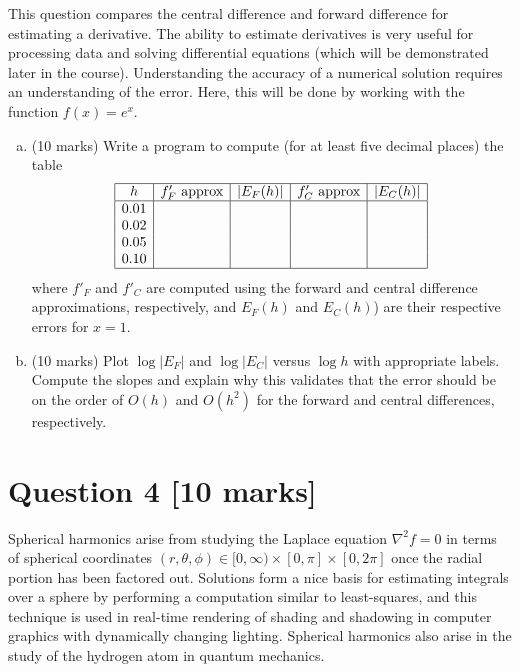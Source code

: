 \documentclass[12pt]{article}
\begin{document}
This question compares the central difference and forward difference for estimating a derivative. The ability to estimate derivatives is very useful for processing data and solving differential equations (which will be demonstrated later in the course). Understanding the accuracy of a numerical solution requires an understanding of the error. Here, this will be done by working with the function $f(x) = e^x$.

\begin{enumerate}[a.]
\item (10 marks) Write a program to compute (for at least five decimal places) the table
\[
\begin{array}{|c|c|c|c|c|}
\hline
h & f_F' \text{ approx} & |E_F(h)| & f'_C \text{ approx} & |E_C(h)| \\ \hline
0.01 &&&& \\
0.02 &&&& \\
0.05 &&&& \\
0.10 &&&& \\ \hline
\end{array}
\]
where $f'_F$ and $f'_C$ are computed using the forward and central difference approximations, respectively, and $E_F(h)$ and $E_C(h)$) are their respective errors for $x = 1$.

\item (10 marks) Plot $\log |E_F|$ and $\log |E_C|$ versus $\log h$ with appropriate labels. Compute the slopes and explain why this validates that the error should be on the order of $O(h)$ and $O(h^2)$ for the forward and central differences, respectively.
\end{enumerate}


\clearpage

\section{\fontsize{14}{14}\selectfont Question 4 [10 marks]}

Spherical harmonics arise from studying the Laplace equation $\nabla^2 f = 0$ in terms of spherical coordinates $(r, \theta, \phi) \in [0, \infty) \times [0, \pi] \times [0, 2\pi]$ once the radial portion has been factored out. Solutions form a nice basis for estimating integrals over a sphere by performing a computation similar to least-squares, and this technique is used in real-time rendering of shading and shadowing in computer graphics with dynamically changing lighting. Spherical harmonics also arise in the study of the hydrogen atom in quantum mechanics.
\end{document}
